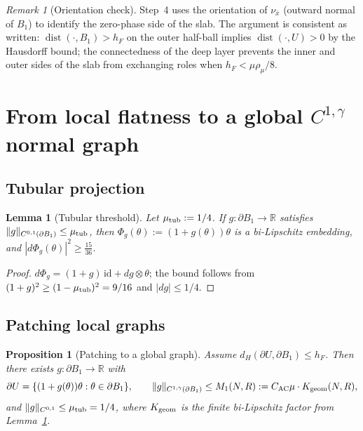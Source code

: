 \documentclass[11pt]{article}
\newtheorem{proposition}[theorem]{Proposition}
\newtheorem{lemma}[theorem]{Lemma}
\theoremstyle{definition}
\theoremstyle{remark}
\newtheorem{remark}[theorem]{Remark}
\newcommand{\BB}{B_1}
\newcommand{\dH}{d_H}
\newcommand{\R}{\mathbb{R}}
\begin{document}
\begin{remark}[Orientation check]\label{rem:orientation}
Step~4 uses the orientation of $\nu_{\bar x}$ (outward normal of $\BB$) to
identify the zero-phase side of the slab. The argument is consistent as
written: $\operatorname{dist}(\cdot,\BB)>h_F$ on the outer half-ball
implies $\operatorname{dist}(\cdot,U)>0$ by the Hausdorff bound; the
connectedness of the deep layer prevents the inner and outer sides of the
slab from exchanging roles when $h_F<\mu\rho_\mu/8$.
\end{remark}

\section{From local flatness to a global $C^{1,\gamma}$ normal graph}
\label{sec:patch}

\subsection{Tubular projection}\label{ssec:tub}

\begin{lemma}[Tubular threshold]\label{lem:tub}
Let $\mu_{\rm tub}:=1/4$. If $g:\partial\BB\to\R$ satisfies
$\|g\|_{C^{0,1}(\partial\BB)}\le\mu_{\rm tub}$, then
$\Phi_g(\theta):=(1+g(\theta))\theta$ is a bi-Lipschitz embedding, and
$|d\Phi_g(\theta)|^2\ge\tfrac{15}{36}$.
\end{lemma}

\begin{proof}
$d\Phi_g=(1+g)\,\mathrm{id}+dg\otimes\theta$; the bound follows from
$(1+g)^2\ge(1-\mu_{\rm tub})^2=9/16$ and $|dg|\le1/4$.
\end{proof}

\subsection{Patching local graphs}\label{ssec:patch}

\begin{proposition}[Patching to a global graph]\label{prop:patch}
Assume $\dH(\partial U,\partial\BB)\le h_F$. Then there exists
$g:\partial\BB\to\R$ with
\[
\partial U=\{(1+g(\theta))\theta:\theta\in\partial\BB\},\qquad
\|g\|_{C^{1,\gamma}(\partial\BB)}\le M_1(N,R):=C_{\rm AC}\mu\cdot K_{\rm geom}(N,R),
\]
and $\|g\|_{C^{0,1}}\le\mu_{\rm tub}=1/4$, where $K_{\rm geom}$ is the
finite bi-Lipschitz factor from Lemma~\ref{lem:tub}.
\end{proposition}
\end{document}
